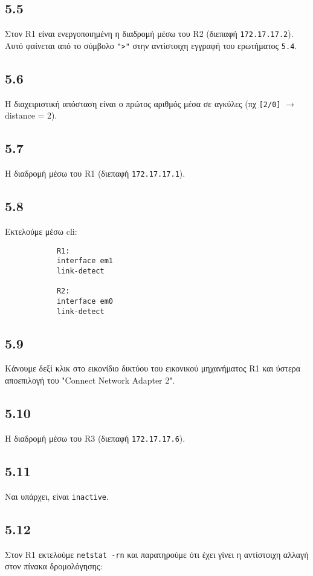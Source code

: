 \documentclass[a4paper, 12pt]{article}
\begin{document}
	\subsection*{5.5}
		Στον R1 είναι ενεργοποιημένη η διαδρομή μέσω του R2 (διεπαφή \verb|172.17.17.2|). Αυτό φαίνεται από το σύμβολο \verb|">"| στην αντίστοιχη εγγραφή του ερωτήματος \verb|5.4|.
		
	\subsection*{5.6}
		Η διαχειριστική απόσταση είναι ο πρώτος αριθμός μέσα σε αγκύλες (πχ \verb|[2/0]| $\rightarrow$ distance = 2).

	\subsection*{5.7}
		Η διαδρομή μέσω του R1 (διεπαφή \verb|172.17.17.1|).

	\subsection*{5.8}
		Εκτελούμε μέσω cli:
		
		\begin{verbatim}
			R1:
			interface em1
			link-detect
			
			R2:
			interface em0
			link-detect
		\end{verbatim}

	\subsection*{5.9}
		Κάνουμε δεξί κλικ στο εικονίδιο δικτύου του εικονικού μηχανήματος R1 και ύστερα αποεπιλογή του "Connect Network Adapter 2".

	\subsection*{5.10}
		Η διαδρομή μέσω του R3 (διεπαφή \verb|172.17.17.6|).

	\subsection*{5.11}
		Ναι υπάρχει, είναι \verb|inactive|.

	\subsection*{5.12}
		Στον R1 εκτελούμε \verb|netstat -rn| και παρατηρούμε ότι έχει γίνει η αντίστοιχη αλλαγή στον πίνακα δρομολόγησης:
		
\end{document}

